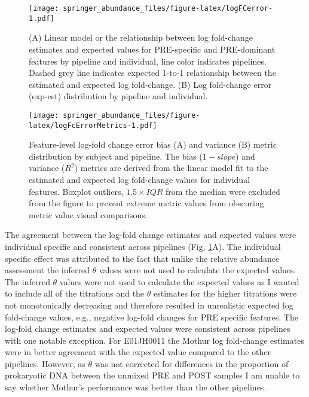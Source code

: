 \documentclass[smallextended]{svjour3}       %
\begin{document}
\begin{figure}
\centering
\texttt{[image: springer\_abundance\_files/figure-latex/logFCerror-1.pdf]}
\caption{\label{fig:logFCerror}(A) Linear model or the relationship between
log fold-change estimates and expected values for PRE-specific and
PRE-dominant features by pipeline and individual, line color indicates
pipelines. Dashed grey line indicates expected 1-to-1 relationship
between the estimated and expected log fold-change. (B) Log fold-change
error (\textbar{}exp-est\textbar{}) distribution by pipeline and
individual.}
\end{figure}

\begin{figure}
\centering
\texttt{[image: springer\_abundance\_files/figure-latex/logFcErrorMetrics-1.pdf]}
\caption{\label{fig:logFcErrorMetrics}Feature-level log-fold change error
bias (A) and variance (B) metric distribution by subject and pipeline.
The bias (\(1 - slope\)) and variance (\(R^2\)) metrics are derived from
the linear model fit to the estimated and expected log fold-change
values for individual features. Boxplot outliers, \(1.5\times IQR\) from
the median were excluded from the figure to prevent extreme metric
values from obscuring metric value visual comparisons.}
\end{figure}

The agreement between the log-fold change estimates and expected values
were individual specific and consistent across pipelines (Fig.
\ref{fig:logFCerror}A). The individual specific effect was attributed to
the fact that unlike the relative abundance assessment the inferred
\(\theta\) values were not used to calculate the expected values. The
inferred \(\theta\) values were not used to calculate the expected
values as I wanted to include all of the titrations and the \(\theta\)
estimates for the higher titrations were not monotonically decreasing
and therefore resulted in unrealistic expected log fold-change values,
e.g., negative log-fold changes for PRE specific features. The log-fold
change estimates and expected values were consistent across pipelines
with one notable exception. For E01JH0011 the Mothur log fold-change
estimates were in better agreement with the expected value compared to
the other pipelines. However, as \(\theta\) was not corrected for
differences in the proportion of prokaryotic DNA between the unmixed PRE
and POST samples I am unable to say whether Mothur's performance was
better than the other pipelines.
\end{document}
